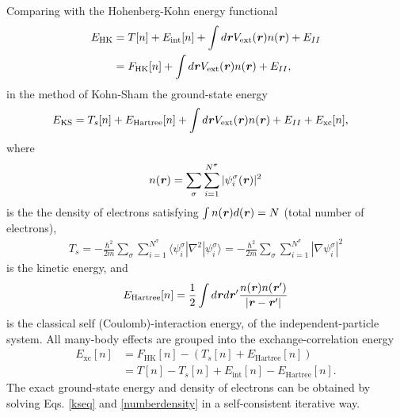 Comparing with the Hohenberg-Kohn energy functional 
\begin{equation}\label{hkeq}
\begin{aligned}
E_\text{HK}
&=T[n]+E_\text{int}[n]+\int{d\textbf{\textit r}}V_\text{ext}(\textbf{\textit r})n(\textbf{\textit r})+E_{II} \\
&=F_\text{HK}[n]+\int{d\textbf{\textit r}}V_\text{ext}(\textbf{\textit r})n(\textbf{\textit r})+E_{II},
\end{aligned}
\end{equation}
in the method of Kohn-Sham the ground-state energy
\begin{equation}\label{kse}
\begin{aligned}
E_\text{KS}&=T_s[n]+E_\text{Hartree}[n]+\int d\textbf{\textit r}V_\text{ext}(\textbf{\textit r})n(\textbf{\textit r})+E_{II}+E_\text{xc}[n],
\end{aligned}
\end{equation}
where 
\begin{equation}\label{numberdensity}
\begin{aligned}
n(\textbf{\textit r})=\sum_\sigma\sum_{i=1}^{N^\sigma}|\psi_i^\sigma(\textbf{\textit r})|^2
\end{aligned}
\end{equation}
is the the density of electrons satisfying $\int n(\textbf{\textit r})d(\textbf{\textit r})=N$ (total number of electrons),
\begin{equation}\label{spTs}
\begin{aligned}
T_s=-\frac{\hbar^2}{2m}\sum_\sigma\sum_{i=1}^{N^\sigma}\langle\psi_i^\sigma|\nabla^2|\psi_i^\sigma\rangle=-\frac{\hbar^2}{2m}\sum_\sigma\sum_{i=1}^{N^\sigma}|\nabla\psi_i^\sigma|^2
\end{aligned}
\end{equation}
is the kinetic energy, and 
\begin{equation}\label{spEhatr}
\begin{aligned}
E_\text{Hartree}[n]=\frac{1}{2}\int{d\textbf{\textit r}d\textbf{\textit r}'}\frac{n(\textbf{\textit r})n(\textbf{\textit r}')}{|\textbf{\textit r}-\textbf{\textit r}'|}
\end{aligned}
\end{equation}
is the classical self (Coulomb)-interaction energy, of the independent-particle system. All many-body effects are grouped into the exchange-correlation energy 
\begin{equation}\label{spExc}
\begin{aligned}
E_\text{xc}[n]&=F_\text{HK}[n]-(T_s[n]+E_\text{Hartree}[n]) \\
&=T[n]-T_s[n]+E_\text{int}[n]-E_\text{Hartree}[n].
\end{aligned}
\end{equation}
%
The exact ground-state energy and density of electrons
can be obtained by solving Eqs. \ref{kseq} and \ref{numberdensity} in a
self-consistent iterative way.

